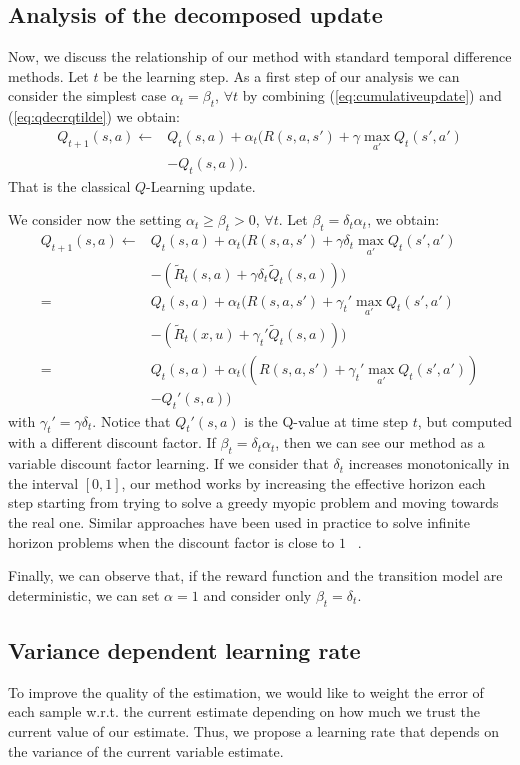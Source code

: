 \subsection{Analysis of the decomposed update}
Now, we discuss the relationship of our method with standard temporal difference methods. Let $t$ be the learning step. As a first step of our analysis we can consider the simplest case $\alpha_t=\beta_t$, $\forall t$ by combining (\ref{eq:cumulativeupdate}) and (\ref{eq:qdecrqtilde}) we obtain:
\begin{align}
Q_{t+1}(s,a) \leftarrow & Q_t(s,a)+\alpha_t(R(s,a,s')+\gamma\max_{a'}Q_t(s',a')\nonumber\\
 & - Q_t(s,a)).
\end{align}
That is the classical $Q$-Learning update. 

We consider now the setting $\alpha_t\geq\beta_t>0$, $\forall t$. Let $\beta_t=\delta_t\alpha_t$, we obtain:
\begin{align}
Q_{t+1}(s,a) \leftarrow & Q_t(s,a)+\alpha_t(R(s,a,s')+\gamma\delta_t \max_{a'}Q_t(s',a') \nonumber\\
  & -(\tilde{R}_t(s,a)+\gamma\delta_t\tilde{Q}_t(s,a))) \nonumber\\
= & Q_t(s,a)+\alpha_t(R(s,a,s')+\gamma_t'\max_{a'}Q_t(s',a') \nonumber\\
  & -(\tilde{R}_t(x,u)+\gamma_t'\tilde{Q}_t(s,a))) \nonumber\\
= & Q_t(s,a)+\alpha_t((R(s,a,s')+\gamma_t'\max_{a'}Q_t(s',a')) \nonumber\\
  & - Q_t'(s,a))
\end{align}
with $\gamma_t'=\gamma\delta_t$. Notice that $Q_t'(s,a)$ is the Q-value at time step $t$, but computed with a different discount factor. If $\beta_t=\delta_t\alpha_t$, then we can see our method as a variable discount factor learning. If we consider that $\delta_t$ increases monotonically in the interval $[0,1]$, our method works by increasing the effective horizon each step starting from trying to solve a greedy myopic problem and moving towards the real one.
Similar approaches have been used in practice to solve infinite horizon problems when the discount factor is close to $1$ ~\cite{crites1996improving, bao2008infinite, franccois2015discount}.

Finally, we can observe that, if the reward function and the transition model are deterministic, we can set $\alpha=1$ and consider only $\beta_t=\delta_t$.

\subsection{Variance dependent learning rate}
To improve the quality of the estimation, we would like to weight the error of each sample w.r.t. the current estimate depending on how much we trust the current value of our estimate. Thus, we propose a learning rate that depends on the variance of the current variable estimate.

